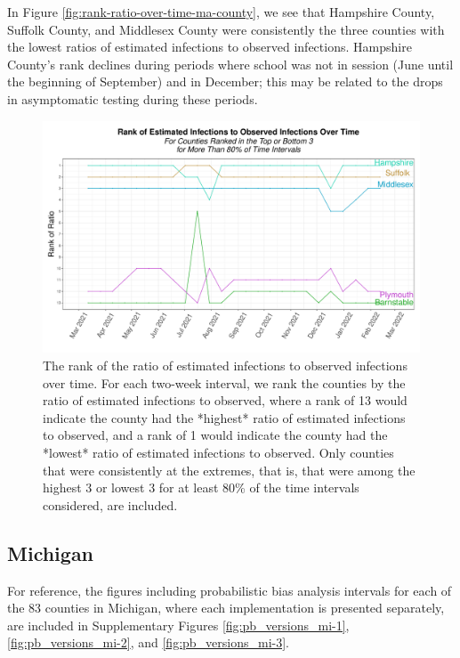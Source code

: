 \documentclass[12pt,twoside]{smiththesis}
\begin{document}
In Figure \ref{fig:rank-ratio-over-time-ma-county}, we see that Hampshire County, Suffolk County, and Middlesex County were consistently the three counties with the lowest ratios of estimated infections to observed infections. Hampshire County's rank declines during periods where school was not in session (June until the beginning of September) and in December; this may be related to the drops in asymptomatic testing during these periods.
\begin{figure}
\includegraphics[width=1\linewidth]{figure/rank-ratio-over-time-ma-county} \caption{\label{fig:rank-ratio-over-time-ma-county}The rank of the ratio of estimated infections to observed infections over time. For each two-week interval, we rank the counties by the ratio of estimated infections to observed, where a rank of 13 would indicate the county had the *highest* ratio of estimated infections to observed, and a rank of 1   would indicate the county had the *lowest* ratio of estimated infections to observed. Only counties that were consistently at the extremes, that is, that were among the highest 3 or lowest 3 for at least 80\% of the time intervals considered, are included.}\label{fig:unnamed-chunk-82}
\end{figure}
\hypertarget{michigan}{%
\subsection{Michigan}\label{michigan}}

For reference, the figures including probabilistic bias analysis intervals for each of the 83 counties in Michigan, where each implementation is presented separately, are included in Supplementary Figures \ref{fig:pb_versions_mi-1}, \ref{fig:pb_versions_mi-2}, and \ref{fig:pb_versions_mi-3}.
\end{document}
